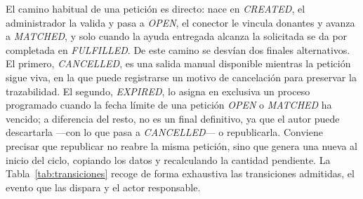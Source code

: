 \documentclass[11pt,oneside,spanish,listoffigures,listoftables]{tfgetsinf}
\begin{document}
El camino habitual de una petición es directo: nace en \textit{CREATED}, el administrador la valida y pasa a \textit{OPEN}, el conector le vincula donantes y avanza a \textit{MATCHED}, y solo cuando la ayuda entregada alcanza la solicitada se da por completada en \textit{FULFILLED}. De este camino se desvían dos finales alternativos. El primero, \textit{CANCELLED}, es una salida manual disponible mientras la petición sigue viva, en la que puede registrarse un motivo de cancelación para preservar la trazabilidad. El segundo, \textit{EXPIRED}, lo asigna en exclusiva un proceso programado cuando la fecha límite de una petición \textit{OPEN} o \textit{MATCHED} ha vencido; a diferencia del resto, no es un final definitivo, ya que el autor puede descartarla —con lo que pasa a \textit{CANCELLED}— o republicarla. Conviene precisar que republicar no reabre la misma petición, sino que genera una nueva al inicio del ciclo, copiando los datos y recalculando la cantidad pendiente. La Tabla~\ref{tab:transiciones} recoge de forma exhaustiva las transiciones admitidas, el evento que las dispara y el actor responsable.
\end{document}
